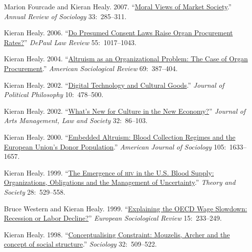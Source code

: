 \documentclass[11pt]{article}
\begin{document}

\ind Marion Fourcade and Kieran Healy. 2007. ``\href{http://arjournals.annualreviews.org/doi/pdf/10.1146/annurev.soc.33.040406.131642}{Moral Views of Market Society}.'' \emph{Annual Review of Sociology} 33:~285--311. 

\ind Kieran Healy. 2006. ``\href{http://www.kieranhealy.org/files/papers/presumed-consent.pdf}{Do Presumed Consent Laws Raise Organ Procurement Rates?}'' \emph{DePaul Law Review} 55:~1017--1043. 

\ind Kieran Healy. 2004. ``\href{http://www.kieranhealy.org/files/papers/asr2004.pdf}{Altruism as an Organizational Problem: The Case of Organ Procurement}.''
 \emph{American Sociological Review} 69:~387--404.

\ind Kieran Healy. 2002. ``\href{http://www.kieranhealy.org/files/papers/jpp.pdf}{Digital Technology and Cultural Goods}.'' \emph{Journal of
  Political Philosophy} 10:~478--500. 

\ind Kieran Healy. 2002. ``\href{http://www.kieranhealy.org/files/papers/culture-newecon.pdf}{What's New for Culture in the New Economy?}'' \emph{Journal
  of Arts Management, Law and Society} 32:~86--103. 


\ind Kieran Healy. 2000. ``\href{http://www.kieranhealy.org/files/papers/embed-alt.pdf}{Embedded Altruism: Blood Collection Regimes and the European
  Union's Donor Population}.'' \emph{American Journal of Sociology} 105:~1633--\,1657.


\ind Kieran Healy. 1999.  ``\href{http://www.kieranhealy.org/files/papers/ts.pdf}{The Emergence of \textsc{hiv} in the U.S. Blood Supply: Organizations,
  Obligations and the Management of Uncertainty}.'' \emph{Theory and Society} 28:~529--558.


\ind Bruce Western and Kieran Healy. 1999. ``\href{http://www.kieranhealy.org/files/papers/western-healy99.pdf}{Explaining the OECD Wage Slowdown:
Recession or Labor Decline?}''  \emph{European Sociological Review}
15:~233--249.


\ind  Kieran Healy. 1998.  ``\href{http://www.kieranhealy.org/files/papers/constraint98.pdf}{Conceptualising Constraint: Mouzelis, Archer and the concept of
  social structure}.'' \emph{Sociology} 32:~509--522. 

\bigskip
\end{document}
